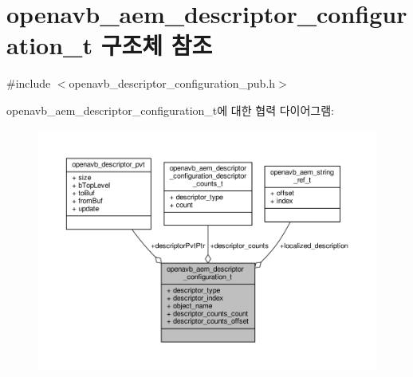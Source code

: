 \hypertarget{structopenavb__aem__descriptor__configuration__t}{}\section{openavb\+\_\+aem\+\_\+descriptor\+\_\+configuration\+\_\+t 구조체 참조}
\label{structopenavb__aem__descriptor__configuration__t}


{\ttfamily \#include $<$openavb\+\_\+descriptor\+\_\+configuration\+\_\+pub.\+h$>$}



openavb\+\_\+aem\+\_\+descriptor\+\_\+configuration\+\_\+t에 대한 협력 다이어그램\+:
\nopagebreak
\begin{figure}[H]
\begin{center}
\leavevmode
\includegraphics[width=350pt]{structopenavb__aem__descriptor__configuration__t__coll__graph}
\end{center}
\end{figure}
